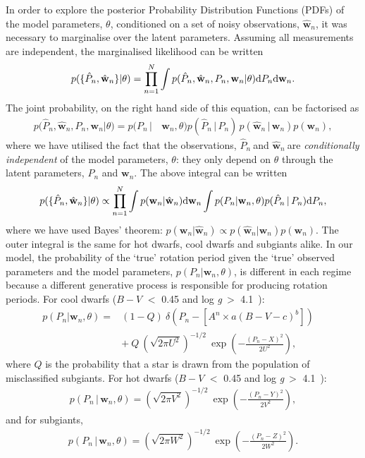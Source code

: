 \documentclass[11pt,preprint]{aastex}
\newcommand{\logg}{log \emph{g}}
\newcommand{\w}{\mathbf{w}}
\newcommand{\wh}{$\hat{\mathbf{w}}_n$}
\newcommand{\ph}{$\hat{P}_n$}
\newcommand{\subcut}{4.1~}
\begin{document}
In order to explore the posterior Probability Distribution Functions (PDFs) of
the model parameters, $\theta$, conditioned on a set of noisy observations,
\wh, it was necessary to marginalise over the latent parameters.
Assuming all measurements are independent, the marginalised likelihood can be
written
\begin{equation}
	p(\{\hat{P}_n,\hat{\w}_n\}|\theta) =
	\prod_{n=1}^{N} \int p(\hat{P}_n,\hat{\w}_n,P_n,\w_n|\theta)
	{\rm d}P_n {\rm d}\w_n.
\label{eq:fulll}
\end{equation}
The joint probability, on the right hand side of this equation, can be
factorised as
\begin{align}
	p(\hat{P}_n,\hat{\w}_n,P_n,\w_n|\theta) = p(P_n\,| & \,\w_n,\theta)
	p(\hat{P}_n\,|\,P_n)\,p(\hat{\w}_n\,|\,\w_n)p(\w_n),
\nonumber
\end{align}
where we have utilised the fact that the observations, \ph$~$and \wh$~$are
{\it conditionally independent} of the model parameters, $\theta$: they only
depend on $\theta$ through the latent parameters, $P_n$ and $\w_n$.
The above integral can  be written
\begin{equation}
	p(\{\hat{P}_n,\hat{\w}_n\}|\theta) \propto
	\prod_{n=1}^{N} \int p(\w_n|\hat{\w}_n)
	{\rm d}\w_n \int p(P_n|\w_n,\theta) p(\hat{P}_n\,|\,P_n) {\rm d}P_n,
\label{eq:fac}
\end{equation}
where we have used Bayes' theorem:
$p(\w_n|\hat{\w}_n) \propto p(\hat{\w}_n|\w_n)p(\w_n)$.
The outer integral is the same for hot dwarfs, cool dwarfs and subgiants
alike.
In our model, the probability of the `true' rotation period given the `true'
observed parameters and the model parameters, $p(P_n|\w_n, \theta)$, is
different in each regime because a different generative process is responsible
for producing rotation periods.
For cool dwarfs ($B-V$ $<$ 0.45 and \logg$~>$ \subcut):
\begin{eqnarray}
	p(P_n|\w_n,\theta) =
	& (1-Q)~\delta \left (P_n - \left[A^n \times a(B-V - c)^b\right]
	\right) \quad \\ & +~Q~\left(\sqrt{2\pi U^2}\right)^{-1/2}
	~\exp\left({-\frac{(P_n-X)^2}{2U^2}}\right),
\end{eqnarray}
where $Q$ is the probability that a star is drawn from the population of
misclassified subgiants.
For hot dwarfs ($B-V$ $<$ 0.45 and \logg$~>$ \subcut):
\begin{eqnarray}
p(P_n\,|\,\w_n,\theta) = \left(\sqrt{2\pi V^2}\right)^{-1/2}~
\exp\left({-\frac{(P_n-Y)^2}{2V^2}}\right),
\end{eqnarray}
and for subgiants,
\begin{eqnarray}
p(P_n\,|\,\w_n,\theta) = \left(\sqrt{2\pi W^2}\right)^{-1/2}~
\exp\left({-\frac{(P_n-Z)^2}{2W^2}}\right).
\end{eqnarray}
\end{document}

